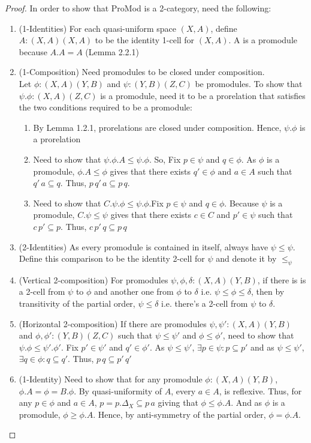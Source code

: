 \documentclass[18pt,a4paper]{article}
\makeatletter
\theoremstyle{definition}
\newcommand{\carrow}{}%
\DeclareRobustCommand{\carrow}{%
	\mathrel{\vphantom{\rightarrow}\mathpalette\circle@arrow\relax}%
}
\newcommand{\circle@arrow}[2]{%
	\m@th
	\ooalign{%
		\hidewidth$#1\circ\mkern1mu$\hidewidth\cr
	$#1\longrightarrow$\cr}%
}
\makeatother
\begin{document}
\begin{proof} In order to show that ProMod is a 2-category, need the following:
	\begin{enumerate}[label=(\alph*)]
		\item (1-Identities) For each quasi-uniform space $(X,A)$,
			define $A:(X,A) \carrow (X,A)$ to be the identity 1-cell for $(X,A)$. A is a promodule
			because $A.A=A$ (Lemma 2.2.1)
		\item (1-Composition) Need promodules to be closed under composition.\\
			Let $\phi:(X,A)\carrow (Y,B)$ and $\psi:(Y,B)\carrow (Z,C)$ be promodules.
			To show that $\psi.\phi:(X,A) \carrow (Z,C)$ is a promodule, need it to be a
			prorelation that satisfies the two conditions required to be a promodule:
			\begin{enumerate}[label=(\roman*)]
				\item By Lemma 1.2.1, prorelations are closed under composition.
					Hence, $\psi.\phi$ is a prorelation
				\item Need to show that $\psi.\phi.A \leq \psi.\phi$. So, Fix
					$p \in \psi$ and $q \in \phi$. As $\phi$ is a promodule,
					$\phi.A\leq \phi$ gives that there exists
					$ q' \in \phi \text{ and } a\in A$ such that
					$q'\,a \subseteq q$. Thus,
					$p\,q'\,a \subseteq p\,q$.
				\item Need to show that $C.\psi.\phi \leq \psi.\phi$.Fix $p \in \psi$
					and $q\in \phi$. Because
					$\psi$ is a promodule, $C.\psi \leq \psi$ gives that
					there exists $c\in C$ and $p' \in \psi$ such that
					$c\,p' \subseteq p$. Thus, $c\,p'\,q \subseteq p\,q$
			\end{enumerate}
		\item (2-Identities) As every promodule is contained in itself, always have $\psi \leq \psi$.
			Define this comparison to be the identity 2-cell for $\psi$ and denote it by $\leq_\psi$

		\item (Vertical 2-composition) For promodules $\psi,\phi,\delta:(X,A) \carrow (Y,B)$,
			if there is is a 2-cell from $\psi$ to $\phi$ and another one from $\phi$
			to $\delta$ i.e. $\psi \leq \phi \leq \delta$, then by transitivity
			of the partial order, $\psi \leq \delta$ i.e. there's a 2-cell from
			$\psi$ to $\delta$.
		\item (Horizontal 2-composition) If there are promodules
			$\psi,\psi':(X,A) \carrow (Y,B)$ and
			$\phi,\phi':(Y,B) \carrow (Z,C)$ such that $\psi \leq \psi'$ and $\phi \leq
			\phi'$, need to show that $\psi.\phi \leq \psi'.\phi'$. Fix $p' \in \psi'$ and
			$q' \in \phi'$. As $\psi\leq\psi'$, $\exists p\in \psi: p \subseteq p'$
			and as $\psi\leq\psi'$, $\exists q \in \phi: q \subseteq q'$.
			Thus, $p\,q\subseteq p'\,q'$
		\item (1-Identity) Need to show that for any promodule $\phi:(X,A) \carrow (Y,B)$,
			$\phi.A=\phi=B.\phi$. By quasi-uniformity of $A$, every $a \in A$, is
			reflexive. Thus, for any $p \in \phi$ and $a \in A$,
			$p=p. \Delta_X \subseteq p \,a$
			giving that $\phi \leq \phi.A$. And as $\phi$ is a promodule,
			$\phi \geq \phi.A$. Hence, by anti-symmetry of the partial order, $\phi=\phi.A$.


\end{enumerate}
\end{proof}
\end{document}
